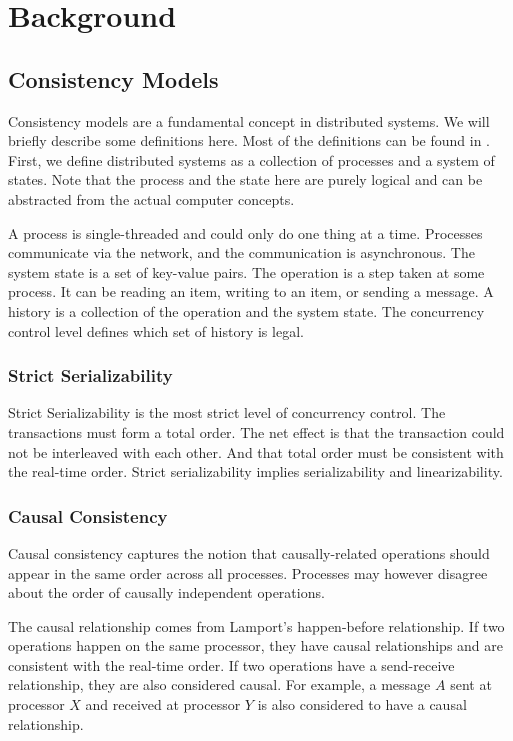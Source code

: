 \chapter{Background}
\section{Consistency Models}
Consistency models are a fundamental concept in distributed systems. We will briefly describe some definitions here. Most of the definitions can be found in \cite{Consiste95:online}. First, we define distributed systems as a collection of processes and a system of states. Note that the process and the state here are purely logical and can be abstracted from the actual computer concepts.

A process is single-threaded and could only do one thing at a time. Processes communicate via the network, and the communication is asynchronous. The system state is a set of key-value pairs. The operation is a step taken at some process. It can be reading an item, writing to an item, or sending a message. A history is a collection of the operation and the system state. The concurrency control level defines which set of history is legal.
\subsection{Strict Serializability}
Strict Serializability is the most strict level of concurrency control. The transactions must form a total order. The net effect is that the transaction could not be interleaved with each other. And that total order must be consistent with the real-time order. Strict serializability implies serializability and linearizability. 
\subsection{Causal Consistency}
Causal consistency captures the notion that causally-related operations should appear in the same order across all processes. Processes may however disagree about the order of causally independent operations.

The causal relationship comes from Lamport's happen-before relationship. If two operations happen on the same processor, they have causal relationships and are consistent with the real-time order. If two operations have a send-receive relationship, they are also considered causal. For example, a message $A$ sent at processor $X$ and received at processor $Y$ is also considered to have a causal relationship.







